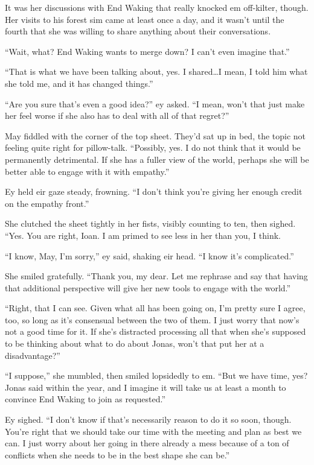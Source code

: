 It was her discussions with End Waking that really knocked em off-kilter, though. Her visits to his forest sim came at least once a day, and it wasn't until the fourth that she was willing to share anything about their conversations.

``Wait, what? End Waking wants to merge down? I can't even imagine that.''

``That is what we have been talking about, yes. I shared\ldots I mean, I told him what she told me, and it has changed things.''

``Are you sure that's even a good idea?'' ey asked. ``I mean, won't that just make her feel worse if she also has to deal with all of that regret?''

May fiddled with the corner of the top sheet. They'd sat up in bed, the topic not feeling quite right for pillow-talk. ``Possibly, yes. I do not think that it would be permanently detrimental. If she has a fuller view of the world, perhaps she will be better able to engage with it with empathy.''

Ey held eir gaze steady, frowning. ``I don't think you're giving her enough credit on the empathy front.''

She clutched the sheet tightly in her fists, visibly counting to ten, then sighed. ``Yes. You are right, Ioan. I am primed to see less in her than you, I think.

``I know, May, I'm sorry,'' ey said, shaking eir head. ``I know it's complicated.''

She smiled gratefully. ``Thank you, my dear. Let me rephrase and say that having that additional perspective will give her new tools to engage with the world.''

``Right, that I can see. Given what all has been going on, I'm pretty sure I agree, too, so long as it's consensual between the two of them. I just worry that now's not a good time for it. If she's distracted processing all that when she's supposed to be thinking about what to do about Jonas, won't that put her at a disadvantage?''

``I suppose,'' she mumbled, then smiled lopsidedly to em. ``But we have time, yes? Jonas said within the year, and I imagine it will take us at least a month to convince End Waking to join as requested.''

Ey sighed. ``I don't know if that's necessarily reason to do it so soon, though. You're right that we should take our time with the meeting and plan as best we can. I just worry about her going in there already a mess because of a ton of conflicts when she needs to be in the best shape she can be.''


